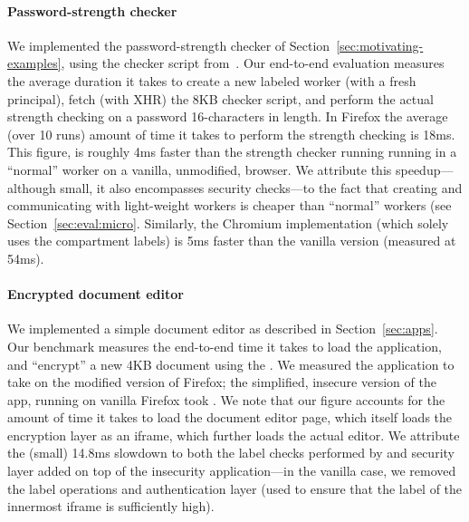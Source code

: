 \paragraph{Password-strength checker}
%
We implemented the password-strength checker of
Section~\ref{sec:motivating-examples}, using the checker script
from~\cite{checker1}.
%
Our end-to-end evaluation measures the average duration it takes to
create a new labeled worker (with a fresh principal), fetch (with XHR)
the 8KB checker script, and perform the actual strength
checking on a password 16-characters in length.
%
%
In Firefox the average (over 10 runs) amount of time it takes to
perform the strength checking is 18ms.
%
This figure, is roughly 4ms faster than the strength checker running
running in a ``normal'' worker on a vanilla, unmodified, browser.
%
We attribute this speedup---although small, it also encompasses
security checks---to the fact that creating and communicating with
light-weight workers is cheaper than ``normal'' workers (see
Section~\ref{sec:eval:micro}.
%
Similarly, the Chromium implementation (which solely uses the
compartment labels) is 5ms faster than the vanilla version (measured
at 54ms).


\paragraph{Encrypted document editor}

We implemented a simple document editor as described in
Section~\ref{sec:apps}.
%
Our benchmark measures the end-to-end time it takes to load the
application, and ``encrypt'' a new 4KB document using
the .
%
We measured the \sys{} application to take  on the modified
version of Firefox; the simplified, insecure version of the app,
running on vanilla Firefox took .
%
We note that our figure accounts for the amount of time it takes to
load the document editor page, which itself loads the encryption layer
as an iframe, which further loads the actual editor.
%
We attribute the (small) 14.8ms slowdown to both the label checks
performed by \sys{} and security layer added on top of the insecurity
application---in the vanilla case, we removed the label operations and
authentication layer (used to ensure that the label of the innermost
iframe is sufficiently high).
%


